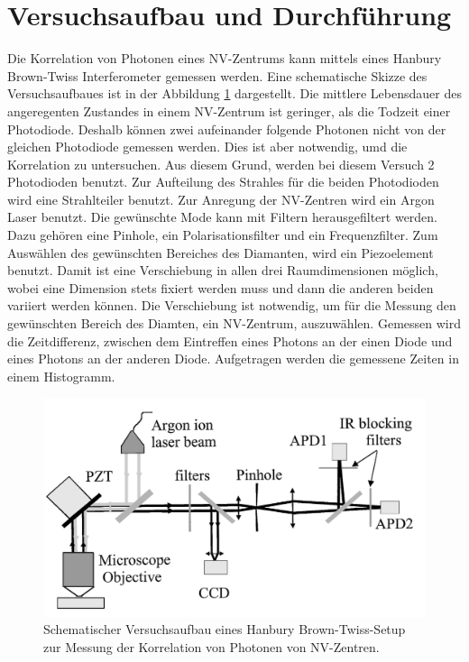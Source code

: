 \section{Versuchsaufbau und Durchf\"uhrung}
Die Korrelation von Photonen eines NV-Zentrums kann mittels eines  Hanbury Brown-Twiss Interferometer
gemessen werden. Eine schematische Skizze des Versuchsaufbaues ist in der Abbildung \ref{fig:Versuchsaufbau} dargestellt. 
Die mittlere Lebensdauer des angeregenten Zustandes in einem NV-Zentrum ist geringer, als die Todzeit einer Photodiode. 
Deshalb k\"onnen zwei aufeinander folgende Photonen nicht von der gleichen Photodiode gemessen werden. 
Dies ist aber notwendig, umd die Korrelation zu untersuchen. Aus diesem Grund, werden bei diesem Versuch 2 Photodioden benutzt. 
Zur Aufteilung des Strahles für die beiden Photodioden wird eine Strahlteiler benutzt. Zur Anregung der NV-Zentren wird ein Argon Laser benutzt. 
Die gewünschte Mode kann mit Filtern herausgefiltert werden. Dazu gehören eine Pinhole, ein Polarisationsfilter und ein Frequenzfilter.  
Zum Ausw\"ahlen des gew\"unschten Bereiches des Diamanten, wird ein Piezoelement benutzt. 
Damit ist eine Verschiebung in allen drei Raumdimensionen m\"oglich, wobei eine Dimension stets fixiert werden muss und dann die anderen beiden variiert werden k\"onnen. 
Die Verschiebung ist notwendig, um f\"ur die Messung den gew\"unschten Bereich des Diamten, ein NV-Zentrum, auszuw\"ahlen. Gemessen wird die Zeitdifferenz, zwischen dem Eintreffen eines Photons an der einen Diode und eines Photons an der anderen Diode. 
Aufgetragen werden die gemessene Zeiten in einem Histogramm.   
\begin{figure}[H]
\centering
\includegraphics[scale=0.5]{Versuchsaufbau.PNG}
\caption{Schematischer Versuchsaufbau eines Hanbury Brown-Twiss-Setup zur Messung der Korrelation von Photonen von NV-Zentren. \cite{brouri}  }
\label{fig:Versuchsaufbau}
\end{figure}
